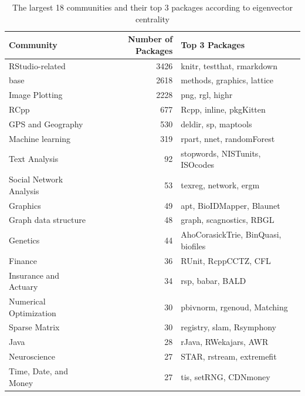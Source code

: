 \begin{table}

\caption{\label{tab:table2}The largest 18 communities and their top 3 packages according to eigenvector centrality}
\centering
\begin{tabular}[t]{l|r|l}
\hline
Community & Number of Packages & Top 3 Packages\\
\hline
RStudio-related & 3426 & knitr, testthat, rmarkdown\\
\hline
base & 2618 & methods, graphics, lattice\\
\hline
Image Plotting & 2228 & png, rgl, highr\\
\hline
RCpp & 677 & Rcpp, inline, pkgKitten\\
\hline
GPS and Geography & 530 & deldir, sp, maptools\\
\hline
Machine learning & 319 & rpart, nnet, randomForest\\
\hline
Text Analysis & 92 & stopwords, NISTunits, ISOcodes\\
\hline
Social Network Analysis & 53 & texreg, network, ergm\\
\hline
Graphics & 49 & apt, BioIDMapper, Blaunet\\
\hline
Graph data structure & 48 & graph, scagnostics, RBGL\\
\hline
Genetics & 44 & AhoCorasickTrie, BinQuasi, biofiles\\
\hline
Finance & 36 & RUnit, RcppCCTZ, CFL\\
\hline
Insurance and Actuary & 34 & rsp, babar, BALD\\
\hline
Numerical Optimization & 30 & pbivnorm, rgenoud, Matching\\
\hline
Sparse Matrix & 30 & registry, slam, Rsymphony\\
\hline
Java & 28 & rJava, RWekajars, AWR\\
\hline
Neuroscience & 27 & STAR, rstream, extremefit\\
\hline
Time, Date, and Money & 27 & tis, setRNG, CDNmoney\\
\hline
\end{tabular}
\end{table}

